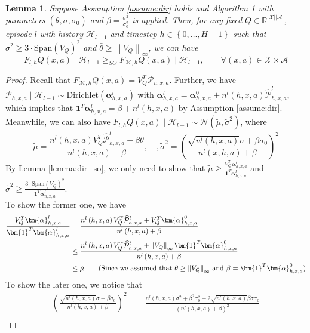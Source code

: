 \documentclass[letterpaper]{article} %
\newcommand{\Sp}[1]{\left(#1\right)}
\newcommand{\Bp}[1]{\left\{#1\right\}}
\newcommand{\abs}[1]{\left|#1\right|}
\newcommand{\Norm}[1]{\left\|#1\right\|}
\newcommand{\R}{\mathbb{R}}
\newcommand{\M}{\mathcal{M}}
\newcommand{\hatp}{\widehat{\mathcal{P}}}
\newcommand{\nls}{n^l\Sp{h, x, a}}
\newtheorem{lemma}{Lemma}
\theoremstyle{definition}
\begin{document}
\begin{lemma}
	\label{lemma:sto_seq}
	Suppose Assumption \ref{assume:dir} holds and Algorithm 1 with parameters $\Sp{\bar{\theta}, \sigma, \sigma_0}$ and $\beta=\frac{\sigma^2}{\sigma_0^2}$ is applied. Then, for any fixed $Q\in\R^{\abs{\mathcal{X}}\abs{\mathcal{A}}}$, episode $l$ with history $\mathcal{H}_{l-1}$ and timestep $h\in\Bp{0, \dots, H-1}$ such that $\sigma^2\geq 3\cdot\mathrm{Span}\Sp{V_Q}^2$ and $\bar{\theta}\geq\Norm{V_Q}_{\infty}$, we can have
	$$F_{l, h}Q\Sp{x, a}\mid\mathcal{H}_{l-1}\geq_{SO}F_{\M, h}Q\Sp{x, a}\mid\mathcal{H}_{l-1},\qquad\forall\Sp{x, a}\in\mathcal{X}\times\mathcal{A}$$
\end{lemma}
\begin{proof}
	Recall that $F_{\M, h}Q\Sp{x, a}=V_Q^T\mathcal{P}_{h, x, a}$. Further, we have $\mathcal{P}_{h, x, a}\mid\mathcal{H}_{l-1}\sim\text{Dirichlet}\Sp{\bm{\alpha}^l_{h, x, a}}$ with $\bm{\alpha}^l_{h, x, a}=\bm{\alpha}^0_{h, x, a}+n^l\Sp{h, x, a}\hatp^l_{h, x, a}$, which implies that $\bm{1}^T\bm{\alpha}^l_{h, x, a}=\beta+n^l\Sp{h, x, a}$ by Assumption \ref{assume:dir}.\\
	Meanwhile, we can also have $F_{l, h}Q\Sp{x, a}\mid\mathcal{H}_{l-1}\sim\mathcal{N}\Sp{\tilde{\mu}, \tilde{\sigma}^2}$, where
	$$\tilde{\mu}=\frac{n^l\Sp{h, x, a}V_Q^T\hatp^l_{h, x, a}+\beta\bar{\theta}}{n^l\Sp{h, x, a}+\beta},\quad, \tilde{\sigma}^2=\Sp{\frac{\sqrt{n^l\Sp{h, x, a}}\sigma+\beta\sigma_0}{n^l\Sp{x, h, a}+\beta}}^2$$
	By Lemma \ref{lemma:dir_so}, we only need to show that $\tilde{\mu}\geq\frac{V_Q^T\bm{\alpha}^l_{h, x, a}}{\bm{1}^T\bm{\alpha}^l_{h, x, a}}$ and $\tilde{\sigma}^2\geq\frac{3\cdot\text{Span}\Sp{V_Q}^2}{\bm{1}^T\bm{\alpha}^l_{h, x, a}}$.\\
	To show the former one, we have
	\begin{align*}
	    \frac{V_Q^T\bm{\alpha}^l_{h, x, a}}{\bm{1}^T\bm{\alpha}^l_{h, x, a}}&=\frac{n^l\Sp{h, x, a}V_Q^T\hatp^l_{h, x, a}+V_Q^T\bm{\alpha}^0_{h, x, a}}{n^l\Sp{h, x, a}+\beta}\\
	    &\leq \frac{n^l\Sp{h, x, a}V_Q^T\hatp^l_{h, x, a}+\Norm{V_Q}_{\infty}\bm{1}^T\bm{\alpha}^0_{h, x, a}}{n^l\Sp{h, x, a}+\beta}\\
	    &\leq\tilde{\mu}\tag{Since we assumed that $\bar{\theta}\geq\Norm{V_Q}_{\infty}$ and $\beta=\bm{1}^T\bm{\alpha}^0_{h, x, a}$}
	\end{align*}
	To show the later one, we notice that
	\begin{align*}
	\Sp{\frac{\sqrt{\nls}\sigma+\beta\sigma_0}{\nls+\beta}}^2&=\frac{\nls\sigma^2+\beta^2\sigma_0^2+2\sqrt{\nls}\beta\sigma\sigma_0}{\Sp{\nls+\beta}^2}\\

\end{align*}
\end{proof}
\end{document}
